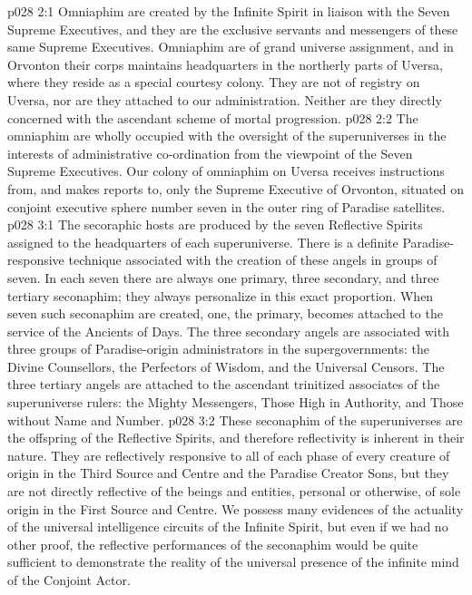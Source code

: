\vs p028 2:1 Omniaphim are created by the Infinite Spirit in liaison with the Seven Supreme Executives, and they are the exclusive servants and messengers of these same Supreme Executives. Omniaphim are of grand universe assignment, and in Orvonton their corps maintains headquarters in the northerly parts of Uversa, where they reside as a special courtesy colony. They are not of registry on Uversa, nor are they attached to our administration. Neither are they directly concerned with the ascendant scheme of mortal progression.
\vs p028 2:2 The omniaphim are wholly occupied with the oversight of the superuniverses in the interests of administrative co\hyp{}ordination from the viewpoint of the Seven Supreme Executives. Our colony of omniaphim on Uversa receives instructions from, and makes reports to, only the Supreme Executive of Orvonton, situated on conjoint executive sphere number seven in the outer ring of Paradise satellites.
\vs p028 3:1 The secoraphic hosts are produced by the seven Reflective Spirits assigned to the headquarters of each superuniverse. There is a definite Paradise\hyp{}responsive technique associated with the creation of these angels in groups of seven. In each seven there are always one primary, three secondary, and three tertiary seconaphim; they always personalize in this exact proportion. When seven such seconaphim are created, one, the primary, becomes attached to the service of the Ancients of Days. The three secondary angels are associated with three groups of Paradise\hyp{}origin administrators in the supergovernments: the Divine Counsellors, the Perfectors of Wisdom, and the Universal Censors. The three tertiary angels are attached to the ascendant trinitized associates of the superuniverse rulers: the Mighty Messengers, Those High in Authority, and Those without Name and Number.
\vs p028 3:2 These seconaphim of the superuniverses are the offspring of the Reflective Spirits, and therefore reflectivity is inherent in their nature. They are reflectively responsive to all of each phase of every creature of origin in the Third Source and Centre and the Paradise Creator Sons, but they are not directly reflective of the beings and entities, personal or otherwise, of sole origin in the First Source and Centre. We possess many evidences of the actuality of the universal intelligence circuits of the Infinite Spirit, but even if we had no other proof, the reflective performances of the seconaphim would be quite sufficient to demonstrate the reality of the universal presence of the infinite mind of the Conjoint Actor.
